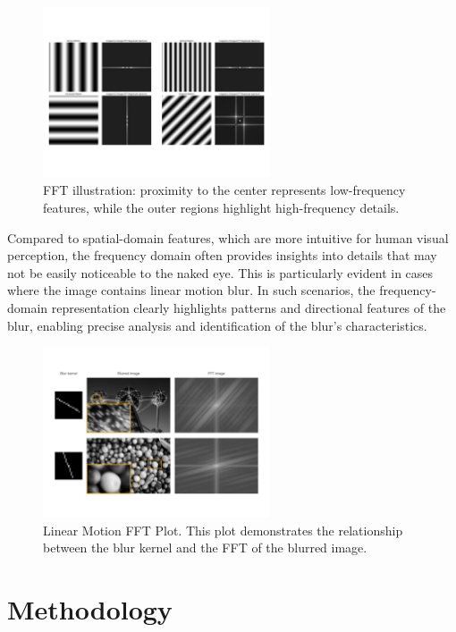 \documentclass[twoside,11pt]{article}
\begin{document}
\begin{figure}[H]
\centering
\includegraphics[width=0.6\textwidth]{figure3.jpg}
\caption{FFT illustration: proximity to the center represents low-frequency features, while the outer regions highlight high-frequency details.}
\end{figure}

Compared to spatial-domain features, which are more intuitive for human visual perception, the frequency domain often provides insights into details that may not be easily noticeable to the naked eye. This is particularly evident in cases where the image contains linear motion blur. In such scenarios, the frequency-domain representation clearly highlights patterns and directional features of the blur, enabling precise analysis and identification of the blur’s characteristics.

\begin{figure}[H]
\centering
\includegraphics[width=0.6\textwidth]{figure4.jpg}
\caption{Linear Motion FFT Plot. This plot demonstrates the relationship between the blur kernel and the FFT of the blurred image.}
\end{figure}


\section{Methodology}
\end{document}
